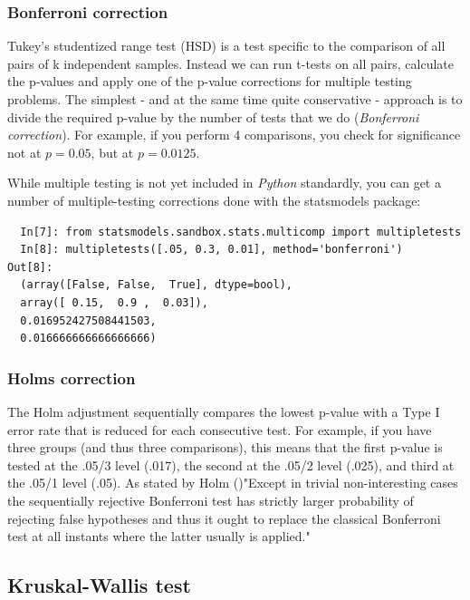 \subsubsection{Bonferroni correction}

Tukey's studentized range test (HSD) is a test specific to the comparison of all pairs of k independent samples. Instead we can run t-tests on all pairs, calculate the p-values and apply one of the p-value corrections for multiple testing problems. The simplest - and at the same time quite conservative - approach is to divide the required p-value by the number of tests that we do (\emph{Bonferroni correction}). For example, if you perform 4 comparisons, you check for significance not at $p=0.05$, but at $p=0.0125$.

While multiple testing is not yet included in \emph{Python} standardly, you can get a number of multiple-testing corrections done with the statsmodels package:

\begin{lstlisting}
  In[7]: from statsmodels.sandbox.stats.multicomp import multipletests
  In[8]: multipletests([.05, 0.3, 0.01], method='bonferroni')
Out[8]:
  (array([False, False,  True], dtype=bool),
  array([ 0.15,  0.9 ,  0.03]),
  0.016952427508441503,
  0.016666666666666666)
\end{lstlisting}

\subsubsection{Holms correction}

The Holm adjustment sequentially compares the lowest p-value with a Type I error rate that is reduced for each consecutive test. For example, if you have three groups (and thus three comparisons), this means that the first p-value is tested at the .05/3 level (.017), the second at the .05/2 level (.025), and third at the .05/1 level (.05).
As stated by Holm (\cite{Holm1979})"Except in trivial non-interesting cases the sequentially rejective Bonferroni test has strictly larger probability of rejecting false hypotheses and thus it ought to replace the classical Bonferroni test at all instants where the latter usually is applied."

\subsection{Kruskal-Wallis test}\label{test:Kruskal-Wallis}

